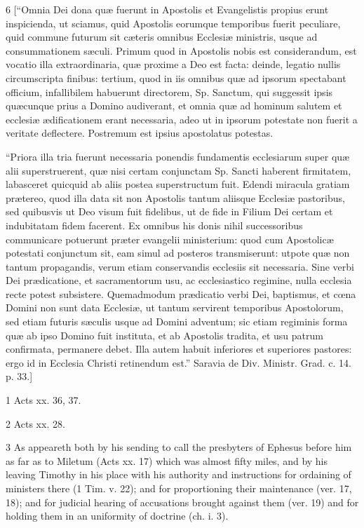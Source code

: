 6
[“Omnia Dei dona quæ fuerunt in Apostolis et Evangelistis propius erunt inspicienda, ut sciamus, quid Apostolis eorumque temporibus fuerit peculiare, quid commune futurum sit cæteris omnibus Ecclesiæ ministris, usque ad consummationem sæculi. Primum quod in Apostolis nobis est considerandum, est vocatio illa extraordinaria, quæ proxime a Deo est facta: deinde, legatio nullis circumscripta finibus: tertium, quod in iis omnibus quæ ad ipsorum spectabant officium, infallibilem habuerunt directorem, Sp. Sanctum, qui suggessit ipsis quæcunque prius a Domino audiverant, et omnia quæ ad hominum salutem et ecclesiæ ædificationem erant necessaria, adeo ut in ipsorum potestate non fuerit a veritate deflectere. Postremum est ipsius apostolatus potestas.

“Priora illa tria fuerunt necessaria ponendis fundamentis ecclesiarum super quæ alii superstruerent, quæ nisi certam conjunctam Sp. Sancti haberent firmitatem, labasceret quicquid ab aliis postea superstructum fuit. Edendi miracula gratiam prætereo, quod illa data sit non Apostolis tantum aliisque Ecclesiæ pastoribus, sed quibusvis ut Deo visum fuit fidelibus, ut de fide in Filium Dei certam et indubitatam fidem facerent. Ex omnibus his donis nihil successoribus communicare potuerunt præter evangelii ministerium: quod cum Apostolicæ potestati conjunctum sit, eam simul ad posteros transmiserunt: utpote quæ non tantum propagandis, verum etiam conservandis ecclesiis sit necessaria. Sine verbi Dei prædicatione, et sacramentorum usu, ac ecclesiastico regimine, nulla ecclesia recte potest subsistere. Quemadmodum prædicatio verbi Dei, baptismus, et cœna Domini non sunt data Ecclesiæ, ut tantum servirent temporibus Apostolorum, sed etiam futuris sæculis usque ad Domini adventum; sic etiam regiminis forma quæ ab ipso Domino fuit instituta, et ab Apostolis tradita, et usu patrum confirmata, permanere debet. Illa autem habuit inferiores et superiores pastores: ergo id in Ecclesia Christi retinendum est.” Saravia de Div. Ministr. Grad. c. 14. p. 33.]

1
Acts xx. 36, 37.

2
Acts xx. 28.

3
As appeareth both by his sending to call the presbyters of Ephesus before him as far as to Miletum (Acts xx. 17) which was almost fifty miles, and by his leaving Timothy in his place with his authority and instructions for ordaining of ministers there (1 Tim. v. 22); and for proportioning their maintenance (ver. 17, 18); and for judicial hearing of accusations brought against them (ver. 19) and for holding them in an uniformity of doctrine (ch. i. 3).

